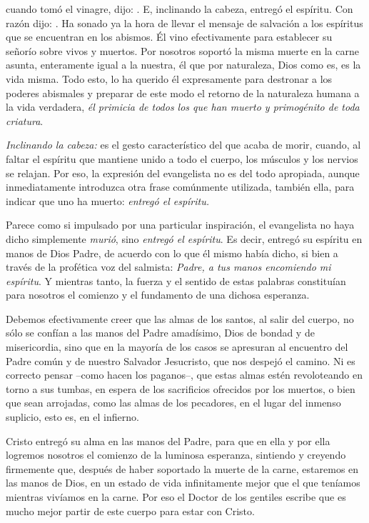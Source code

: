 \begin{body}
 cuando tomó el vinagre, dijo: . E, inclinando la cabeza, entregó el espíritu. Con razón dijo: . Ha sonado ya la hora de llevar el mensaje de salvación a los espíritus que se encuentran en los abismos. Él vino efectivamente para establecer su señorío sobre vivos y muertos. Por nosotros soportó la misma muerte en la carne asunta, enteramente igual a la nuestra, él que por naturaleza, Dios como es, es la vida misma. Todo esto, lo ha querido él expresamente para destronar a los poderes abismales y preparar de este modo el retorno de la naturaleza humana a la vida verdadera, \textit{él primicia de todos los que han muerto y primogénito de toda criatura}.

\textit{Inclinando la cabeza:} es el gesto característico del que acaba de morir, cuando, al faltar el espíritu que mantiene unido a todo el cuerpo, los músculos y los nervios se relajan. Por eso, la expresión del evangelista no es del todo apropiada, aunque inmediatamente introduzca otra frase comúnmente utilizada, también ella, para indicar que uno ha muerto: \textit{entregó el espíritu.}

Parece como si impulsado por una particular inspiración, el evangelista no haya dicho simplemente \textit{murió}, sino \textit{entregó el espíritu}. Es decir, entregó su espíritu en manos de Dios Padre, de acuerdo con lo que él mismo había dicho, si bien a través de la profética voz del salmista: \textit{Padre, a tus manos encomiendo mi espíritu}. Y mientras tanto, la fuerza y el sentido de estas palabras constituían para nosotros el comienzo y el fundamento de una dichosa esperanza.

Debemos efectivamente creer que las almas de los santos, al salir del cuerpo, no sólo se confían a las manos del Padre amadísimo, Dios de bondad y de misericordia, sino que en la mayoría de los casos se apresuran al encuentro del Padre común y de nuestro Salvador Jesucristo, que nos despejó el camino. Ni es correcto pensar –como hacen los paganos–, que estas almas estén revoloteando en torno a sus tumbas, en espera de los sacrificios ofrecidos por los muertos, o bien que sean arrojadas, como las almas de los pecadores, en el lugar del inmenso suplicio, esto es, en el infierno.

Cristo entregó su alma en las manos del Padre, para que en ella y por ella logremos nosotros el comienzo de la luminosa esperanza, sintiendo y creyendo firmemente que, después de haber soportado la muerte de la carne, estaremos en las manos de Dios, en un estado de vida infinitamente mejor que el que teníamos mientras vivíamos en la carne. Por eso el Doctor de los gentiles escribe que es mucho mejor partir de este cuerpo para estar con Cristo.
\end{body}

